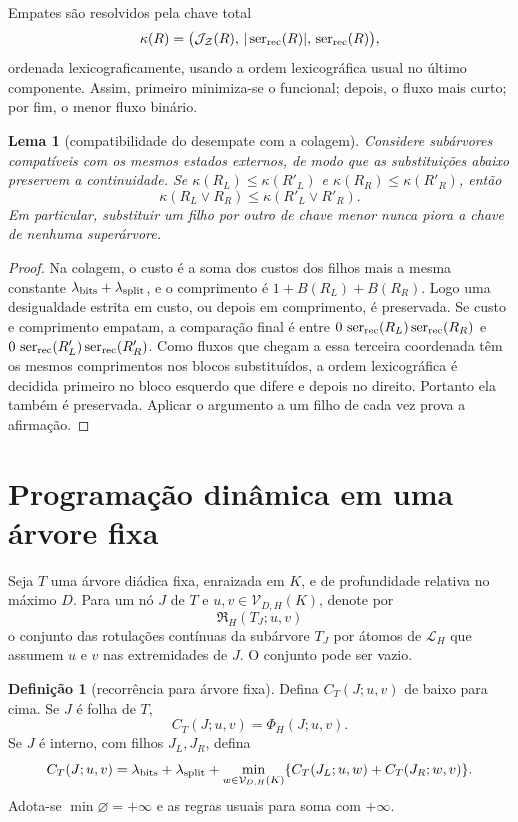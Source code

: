 \documentclass[11pt,a4paper]{article}
\newtheorem{lemma}[theorem]{Lema}
\theoremstyle{definition}
\newtheorem{definition}[theorem]{Definição}
\theoremstyle{remark}
\newcommand{\Library}{\mathcal{L}}
\newcommand{\Representations}{\mathfrak{R}}
\newcommand{\Values}{\mathcal{V}}
\newcommand{\ser}{\operatorname{ser}}
\newcommand{\cost}{\mathcal{J}}
\begin{document}
Empates são resolvidos pela chave total
\begin{equation}
 \kappa(R)=
 \bigl(\cost_{\mathcal Z}(R),\,
       |\ser_{\rm rec}(R)|,\,
       \ser_{\rm rec}(R)\bigr),
 \label{eq:tie-key}
\end{equation}
ordenada lexicograficamente, usando a ordem lexicográfica usual no último
componente. Assim, primeiro minimiza-se o funcional; depois, o fluxo mais
curto; por fim, o menor fluxo binário.

\begin{lemma}[compatibilidade do desempate com a colagem]
\label{lem:tie-concatenation}
Considere subárvores compatíveis com os mesmos estados externos, de modo que
as substituições abaixo preservem a continuidade. Se
$\kappa(R_L)\le\kappa(R'_L)$ e $\kappa(R_R)\le\kappa(R'_R)$, então
\[
 \kappa(R_L\vee R_R)\le\kappa(R'_L\vee R'_R).
\]
Em particular, substituir um filho por outro de chave menor nunca piora a
chave de nenhuma superárvore.
\end{lemma}

\begin{proof}
Na colagem, o custo é a soma dos custos dos filhos mais a mesma constante
$\lambda_{\rm bits}+\lambda_{\rm split}$, e o comprimento é
$1+B(R_L)+B(R_R)$. Logo uma desigualdade estrita em custo, ou depois em
comprimento, é preservada. Se custo e comprimento empatam, a comparação final
é entre
$0\,\ser_{\rm rec}(R_L)\ser_{\rm rec}(R_R)$ e
$0\,\ser_{\rm rec}(R'_L)\ser_{\rm rec}(R'_R)$. Como fluxos que chegam a essa
terceira coordenada têm os mesmos comprimentos nos blocos substituídos, a
ordem lexicográfica é decidida primeiro no bloco esquerdo que difere e depois
no direito. Portanto ela também é preservada. Aplicar o argumento a um filho
de cada vez prova a afirmação.
\end{proof}

\section{Programação dinâmica em uma árvore fixa}
\label{sec:fixed-dp}

Seja $T$ uma árvore diádica fixa, enraizada em $K$, e de profundidade
relativa no máximo $D$. Para um nó $J$ de $T$ e
$u,v\in\Values_{D,H}(K)$, denote por
\[
 \Representations_H(T_J;u,v)
\]
o conjunto das rotulações contínuas da subárvore $T_J$ por átomos de
$\Library_H$ que assumem $u$ e $v$ nas extremidades de $J$. O conjunto pode
ser vazio.

\begin{definition}[recorrência para árvore fixa]
\label{def:fixed-recurrence}
Defina $C_T(J;u,v)$ de baixo para cima. Se $J$ é folha de $T$,
\begin{equation}
 C_T(J;u,v)=\Phi_H(J;u,v).
 \label{eq:fixed-leaf}
\end{equation}
Se $J$ é interno, com filhos $J_L,J_R$, defina
\begin{equation}
 C_T(J;u,v)=\lambda_{\rm bits}+\lambda_{\rm split}
 +\min_{w\in\Values_{D,H}(K)}
 \{C_T(J_L;u,w)+C_T(J_R;w,v)\}.
 \label{eq:fixed-split}
\end{equation}
Adota-se $\min\varnothing=+\infty$ e as regras usuais para soma com
$+\infty$.
\end{definition}
\end{document}
